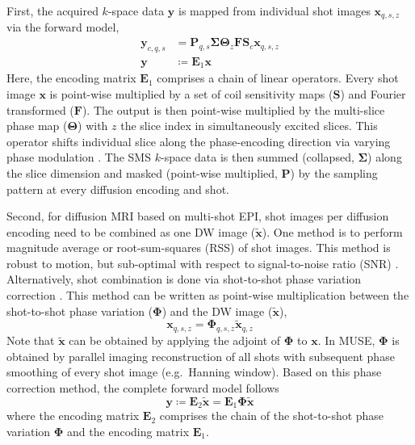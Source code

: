 \documentclass[preprint,12pt,authoryear,review]{elsarticle}
\begin{document}
	First, the acquired $k$-space data $\mathbf{y}$ is mapped from
	individual shot images $\mathbf{x}_{q,s,z}$ via the forward model,
	\begin{align}
		\mathbf{y}_{c,q,s} &= \mathbf{P}_{q,s} \mathbf{\Sigma} \mathbf{\Theta}_{z} \mathbf{F} \mathbf{S}_c \mathbf{x}_{q,s,z} \\
		\mathbf{y} &\coloneqq \mathbf{E}_1 \mathbf{x} \label{EQU:model_shot}
	\end{align}
	Here, the encoding matrix $\mathbf{E}_1$ comprises a chain of linear operators.
	Every shot image $\mathbf{x}$ is point-wise multiplied
	by a set of coil sensitivity maps ($\mathbf{S}$) and Fourier transformed ($\mathbf{F}$).
	The output is then point-wise multiplied by the multi-slice phase map ($\mathbf{\Theta}$)
	with $z$ the slice index in simultaneously excited slices.
	This operator shifts individual slice along the phase-encoding direction
	via varying phase modulation \citep{breuer_2005_caipi}.
	The SMS $k$-space data is then
	summed (collapsed, $\mathbf{\Sigma}$) along the slice dimension and
	masked (point-wise multiplied, $\mathbf{P}$) by
	the sampling pattern at every diffusion encoding and shot.

	Second, for diffusion MRI based on multi-shot EPI,
	shot images per diffusion encoding
	need to be combined as one DW image ($\mathbf{\tilde{x}}$).
	One method is to perform magnitude average \citep{chen_2013_muse}
	or root-sum-squares (RSS) \citep{mani_2017_mussels}
	of shot images.
	This method is robust to motion,
	but sub-optimal with respect to signal-to-noise ratio (SNR)
	\citep{guhaniyogi_2016_amuse}.
	Alternatively, shot combination is done via shot-to-shot phase variation correction \citep{liu_2005_moco_diff,chen_2013_muse}.
	This method can be written as point-wise multiplication
	between the shot-to-shot phase variation ($\mathbf{\Phi}$) and
        the DW image ($\mathbf{\tilde{x}}$),
	\begin{equation}
		 \mathbf{x}_{q,s,z} = \mathbf{\Phi}_{q,s,z} \mathbf{\tilde{x}}_{q,z}
	\end{equation}
	Note that $\mathbf{\tilde{x}}$ can be obtained
	by applying the adjoint of $\mathbf{\Phi}$ to $\mathbf{x}$.
        In MUSE, $\mathbf{\Phi}$ is obtained by parallel imaging reconstruction of all shots
        with subsequent phase smoothing of every shot image (e.g.~Hanning window).
	Based on this phase correction method, the complete forward model follows
	\begin{equation}
		\mathbf{y} \coloneqq \mathbf{E}_2 \mathbf{\tilde{x}} = \mathbf{E}_1 \mathbf{\Phi} \mathbf{\tilde{x}}
		\label{EQU:model_dwi}
	\end{equation}
	where the encoding matrix $\mathbf{E}_2$ comprises the chain of
	the shot-to-shot phase variation $\mathbf{\Phi}$ and
	the encoding matrix $\mathbf{E}_1$.
\end{document}
